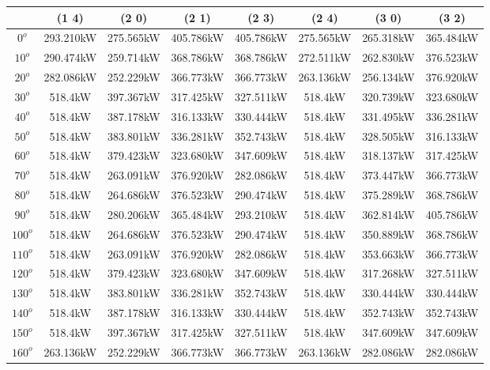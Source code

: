         \begin{table}[H]
        	\centering
        	\begin{tabular}{|c|c|c|c|c|c|c|c|} \hline
        		& (1 4)		& (2 0)		& (2 1)		& (2 3)		& (2 4)		& (3 0)		& (3 2)		\\ \hline
		$0^o$	& 293.210kW	& 275.565kW	& 405.786kW	& 405.786kW	& 275.565kW	& 265.318kW	& 365.484kW	\\ \hline
		$10^o$	& 290.474kW	& 259.714kW	& 368.786kW	& 368.786kW	& 272.511kW	& 262.830kW	& 376.523kW	\\ \hline
		$20^o$	& 282.086kW	& 252.229kW	& 366.773kW	& 366.773kW	& 263.136kW	& 256.134kW	& 376.920kW	\\ \hline
		$30^o$	& 518.4kW	& 397.367kW	& 317.425kW	& 327.511kW	& 518.4kW	& 320.739kW	& 323.680kW	\\ \hline
		$40^o$	& 518.4kW	& 387.178kW	& 316.133kW	& 330.444kW	& 518.4kW	& 331.495kW	& 336.281kW	\\ \hline
		$50^o$	& 518.4kW	& 383.801kW	& 336.281kW	& 352.743kW	& 518.4kW	& 328.505kW	& 316.133kW	\\ \hline
		$60^o$	& 518.4kW	& 379.423kW	& 323.680kW	& 347.609kW	& 518.4kW	& 318.137kW	& 317.425kW	\\ \hline
		$70^o$	& 518.4kW	& 263.091kW	& 376.920kW	& 282.086kW	& 518.4kW	& 373.447kW	& 366.773kW	\\ \hline
		$80^o$	& 518.4kW	& 264.686kW	& 376.523kW	& 290.474kW	& 518.4kW	& 375.289kW	& 368.786kW	\\ \hline
		$90^o$	& 518.4kW	& 280.206kW	& 365.484kW	& 293.210kW	& 518.4kW	& 362.814kW	& 405.786kW	\\ \hline
		$100^o$	& 518.4kW	& 264.686kW	& 376.523kW	& 290.474kW	& 518.4kW	& 350.889kW	& 368.786kW	\\ \hline
		$110^o$	& 518.4kW	& 263.091kW	& 376.920kW	& 282.086kW	& 518.4kW	& 353.663kW	& 366.773kW	\\ \hline
		$120^o$	& 518.4kW	& 379.423kW	& 323.680kW	& 347.609kW	& 518.4kW	& 317.268kW	& 327.511kW	\\ \hline
		$130^o$	& 518.4kW	& 383.801kW	& 336.281kW	& 352.743kW	& 518.4kW	& 330.444kW	& 330.444kW	\\ \hline
		$140^o$	& 518.4kW	& 387.178kW	& 316.133kW	& 330.444kW	& 518.4kW	& 352.743kW	& 352.743kW	\\ \hline
		$150^o$	& 518.4kW	& 397.367kW	& 317.425kW	& 327.511kW	& 518.4kW	& 347.609kW	& 347.609kW	\\ \hline
		$160^o$	& 263.136kW	& 252.229kW	& 366.773kW	& 366.773kW	& 263.136kW	& 282.086kW	& 282.086kW	\\ \hline

\end{tabular}
\end{table}
